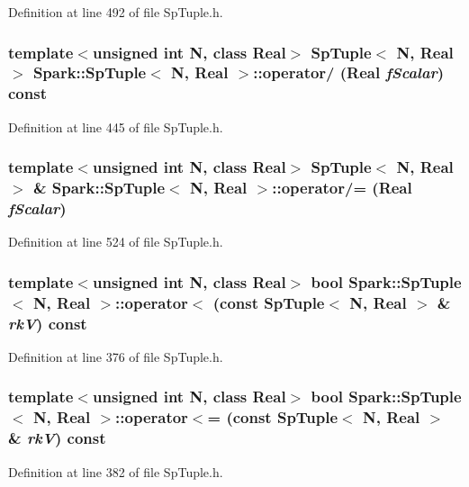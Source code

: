 Definition at line 492 of file Sp\-Tuple.h.
\subsubsection{\setlength{\rightskip}{0pt plus 5cm}template$<$unsigned int N, class Real$>$ {\bf Sp\-Tuple}$<$ N, Real $>$ {\bf Spark::Sp\-Tuple}$<$ N, Real $>$::operator/ (Real {\em f\-Scalar}) const}\label{classSpark_1_1SpTuple_a20}


Definition at line 445 of file Sp\-Tuple.h.
\subsubsection{\setlength{\rightskip}{0pt plus 5cm}template$<$unsigned int N, class Real$>$ {\bf Sp\-Tuple}$<$ N, Real $>$ \& {\bf Spark::Sp\-Tuple}$<$ N, Real $>$::operator/= (Real {\em f\-Scalar})}\label{classSpark_1_1SpTuple_a27}


Definition at line 524 of file Sp\-Tuple.h.
\subsubsection{\setlength{\rightskip}{0pt plus 5cm}template$<$unsigned int N, class Real$>$ bool {\bf Spark::Sp\-Tuple}$<$ N, Real $>$::operator$<$ (const {\bf Sp\-Tuple}$<$ N, Real $>$ \& {\em rk\-V}) const}\label{classSpark_1_1SpTuple_a11}


Definition at line 376 of file Sp\-Tuple.h.
\subsubsection{\setlength{\rightskip}{0pt plus 5cm}template$<$unsigned int N, class Real$>$ bool {\bf Spark::Sp\-Tuple}$<$ N, Real $>$::operator$<$= (const {\bf Sp\-Tuple}$<$ N, Real $>$ \& {\em rk\-V}) const}\label{classSpark_1_1SpTuple_a12}


Definition at line 382 of file Sp\-Tuple.h.

